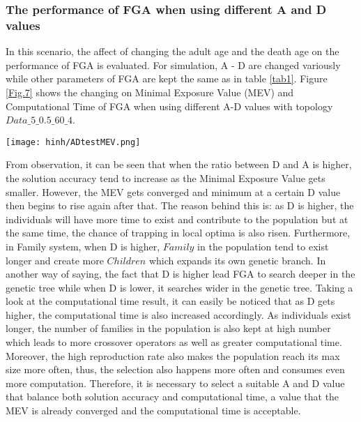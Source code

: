 \documentclass[final]{elsarticle}
\begin{document}
\subsubsection{The performance of FGA when using different A and D values}
In this scenario, the affect of changing the adult age and the death age on the performance of FGA is evaluated. For simulation, A - D are changed variously while other parameters of FGA are kept the same as in table \ref{tab1}. Figure \ref{Fig.7} shows the changing on Minimal Exposure Value (MEV) and Computational Time of FGA when using different A-D values with topology $Data\_5\_0.5\_60\_4$.
\begin{figure*}[h]
	\texttt{[image: hinh/ADtestMEV.png]}
	\centering
	\caption{The Minimal Exposure Value when using different A-D values
	}
	\label{Fig.7}       %
\end{figure*}

From observation, it can be seen that when the ratio between D and A is higher, the solution accuracy tend to increase as the Minimal Exposure Value gets smaller. However, the MEV gets converged and minimum at a certain D value then begins to rise again after that. The reason behind this is: as D is higher, the individuals will have more time to exist and contribute to the population but at the same time, the chance of trapping in local optima is also risen. Furthermore, in Family system, when D is higher, $ Family $ in the population tend to exist longer and create more $ Children $ which expands its own genetic branch. In another way of saying, the fact that D is higher lead FGA to search deeper in the genetic tree while when D is lower, it searches wider in the genetic tree. Taking a look at the computational time result, it can easily be noticed that as D gets higher, the computational time is also increased accordingly. As individuals exist longer, the number of families in the population is also kept at high number which leads to more crossover operators as well as greater computational time. Moreover, the high reproduction rate also makes the population reach its max size more often, thus, the selection also happens more often and consumes even more computation. Therefore, it is necessary to select a suitable A and D value that balance both solution accuracy and computational time, a value that the MEV is already converged and the computational time is acceptable.  
\end{document}
